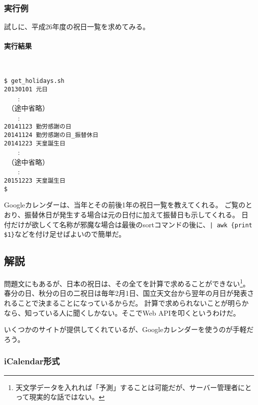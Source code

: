 \subsubsection*{実行例}

試しに、平成26年度の祝日一覧を求めてみる。

\paragraph{実行結果} 　
\begin{screen}
	\verb|$ get_holidays.sh| \return \\
	\verb|20130101 元日| \\
	　　: \\
	　（途中省略） \\
	　　: \\
	\verb|20141123 勤労感謝の日| \\
	\verb|20141124 勤労感謝の日_振替休日| \\
	\verb|20141223 天皇誕生日| \\
	　　: \\
	　（途中省略） \\
	　　: \\
	\verb|20151223 天皇誕生日| \\
	\verb|$ |
\end{screen}

Googleカレンダーは、当年とその前後1年の祝日一覧を教えてくれる。
ご覧のとおり、振替休日が発生する場合は元の日付に加えて振替日も示してくれる。
日付だけが欲しくて名称が邪魔な場合は最後のsortコマンドの後に、\verb!| awk {print $1}!などを付け足せばよいので簡単だ。

\subsection*{解説}

問題文にもあるが、日本の祝日は、その全てを計算で求めることができない\footnote{天文学データを入れれば「予測」することは可能だが、サーバー管理者にとって現実的な話ではない。}。
春分の日、秋分の日の二祝日は毎年2月1日、国立天文台から翌年の月日が発表されることで決まることになっているからだ。
計算で求められないことが明らかなら、知っている人に聞くしかない。そこでWeb APIを叩くというわけだ。

いくつかのサイトが提供してくれているが、Googleカレンダーを使うのが手軽だろう。

\subsubsection*{iCalendar形式}

